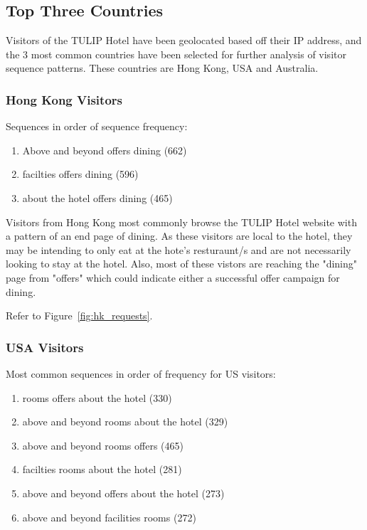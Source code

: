 \subsection{Top Three Countries}
\label{sec:results:countries}

Visitors of the TULIP Hotel have been geolocated based off their IP address, and the 3 most common countries have been selected for further analysis of visitor sequence patterns. These countries are Hong Kong, USA and Australia.

\subsubsection{Hong Kong Visitors}
\label{sec:results:countries:hk}

Sequences in order of sequence frequency:
\begin{enumerate}
  \item Above and beyond \ra{} offers \ra{} dining (662)
  \item facilties \ra{} offers \ra{} dining (596)
  \item about the hotel \ra{} offers \ra{} dining (465)
\end{enumerate}

Visitors from Hong Kong most commonly browse the TULIP Hotel website with a pattern of an end page of dining. As these visitors are local to the hotel, they may be intending to only eat at the hote's resturaunt/s and are not necessarily looking to stay at the hotel. Also, most of these vistors are reaching the "dining" page from "offers" which could indicate either a successful offer campaign for dining.

Refer to Figure~\ref{fig:hk_requests}.


\subsubsection{USA Visitors}
\label{sec:results:countries:us}

Most common sequences in order of frequency for US visitors:
\begin{enumerate}
  \item rooms \ra{} offers \ra{} about the hotel (330)
  \item above and beyond \ra{} rooms \ra{} about the hotel (329)
  \item above and beyond \ra{} rooms \ra{} offers (465)
  \item facilties \ra{} rooms \ra{} about the hotel (281)
  \item above and beyond \ra{} offers \ra{} about the hotel (273)
  \item above and beyond \ra{} facilities \ra{} rooms (272)
\end{enumerate}


